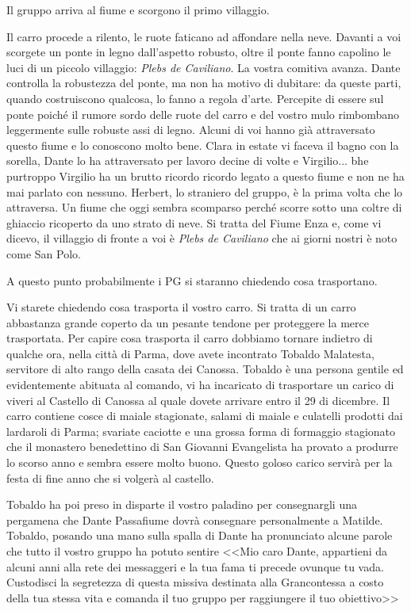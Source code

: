 \documentclass[letterpaper,twocolumn,openany,nodeprecatedcode]{dndbook}
\begin{document}
Il gruppo arriva al fiume e scorgono il primo villaggio.

\begin{DndReadAloud}
Il carro procede a rilento, le ruote faticano ad affondare nella neve. Davanti a voi scorgete un ponte in legno dall'aspetto robusto, oltre il ponte fanno capolino le luci di un piccolo villaggio: \textit{Plebs de Caviliano}. La vostra comitiva avanza. Dante controlla la robustezza del ponte, ma non ha motivo di dubitare: da queste parti, quando costruiscono qualcosa, lo fanno a regola d'arte. Percepite di essere sul ponte poiché il rumore sordo delle ruote del carro e del vostro mulo rimbombano leggermente sulle robuste assi di legno. Alcuni di voi hanno già attraversato questo fiume e lo conoscono molto bene. Clara in estate vi faceva il bagno con la sorella, Dante lo ha attraversato per lavoro decine di volte e Virgilio... bhe purtroppo Virgilio ha un brutto ricordo ricordo legato a questo fiume e non ne ha mai parlato con nessuno. Herbert, lo straniero del gruppo, è la prima volta che lo attraversa. Un fiume che oggi sembra scomparso perché scorre sotto una coltre di ghiaccio ricoperto da uno strato di neve. Si tratta del Fiume Enza e, come vi dicevo, il villaggio di fronte a voi è  \textit{Plebs de Caviliano} che ai giorni nostri è noto come San Polo.
\end{DndReadAloud}

A questo punto probabilmente i PG si staranno chiedendo cosa trasportano.

\begin{DndReadAloud}
Vi starete chiedendo cosa trasporta il vostro carro. Si tratta di un carro abbastanza grande coperto da un pesante tendone per proteggere la merce trasportata. Per capire cosa trasporta il carro dobbiamo tornare indietro di qualche ora, nella città di Parma, dove avete incontrato Tobaldo Malatesta, servitore di alto rango della casata dei Canossa. Tobaldo è una persona gentile ed evidentemente abituata al comando, vi ha incaricato di trasportare un carico di viveri al Castello di Canossa al quale dovete arrivare entro il 29 di dicembre. Il carro contiene cosce di maiale stagionate, salami di maiale e culatelli prodotti dai lardaroli di Parma; svariate caciotte e una grossa forma di formaggio stagionato che il monastero benedettino di San Giovanni Evangelista ha provato a produrre lo scorso anno e sembra essere molto buono. Questo goloso carico servirà per la festa di fine anno che si volgerà al castello.

Tobaldo ha poi preso in disparte il vostro paladino per consegnargli una pergamena che Dante Passafiume dovrà consegnare personalmente a Matilde. Tobaldo, posando una mano sulla spalla di Dante ha pronunciato alcune parole che tutto il vostro gruppo ha potuto sentire <<Mio caro Dante, appartieni da alcuni anni alla rete dei messaggeri e la tua fama ti precede ovunque tu vada. Custodisci la segretezza di questa missiva destinata alla Grancontessa a costo della tua stessa vita e comanda il tuo gruppo per raggiungere il tuo obiettivo>>
\end{DndReadAloud}
\end{document}
